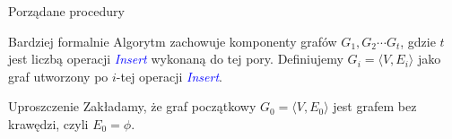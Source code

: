 \documentclass{beamer}
\newcommand{\emp}[1]{\textcolor{blue}{\textit{#1}}}
\newcommand{\tuple}[2]{\langle #1 , #2 \rangle}
\begin{document}
\begin{frame}{Porządane procedury}
\begin{block}{Bardziej formalnie}
Algorytm zachowuje komponenty grafów $G_1,G_2 \cdots G_t$, gdzie $t$ jest liczbą operacji \emp{Insert} wykonaną do tej pory. Definiujemy $G_i=\tuple{V}{E_i}$ jako graf utworzony po $i$-tej operacji \emp{Insert}.
\end{block}

\begin{block}{Uproszczenie}
Zakładamy, że graf początkowy $G_0=\tuple{V}{E_0}$ jest grafem bez krawędzi, czyli $E_0 = \phi$. 
\end{block}
\end{frame}

\end{document}
